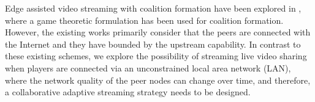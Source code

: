 Edge assisted video streaming with coalition formation have been explored in \cite{EdgeNode-GameTheory-Globecomm-2018}, where a game theoretic formulation has been used for coalition formation. 
However, the existing works primarily consider that the peers are connected with the Internet and they have bounded by the upstream capability. In contrast to these existing schemes, we explore the possibility of streaming live video sharing when players are connected via an unconstrained local area network (LAN), where the network quality of the peer nodes can change over time, and therefore, a collaborative adaptive streaming strategy needs to be designed. 


